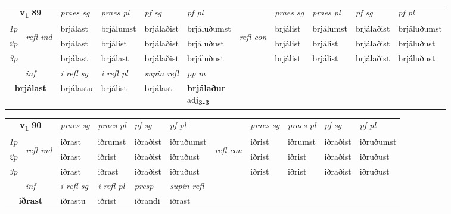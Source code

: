 \noindent
\begin{tabular}{lllllllllll} \toprule
\multicolumn{2}{c}{\textbf{v{\textsubscript{1}}} \Large{\textbf{89}}}  &  \textit{praes sg}  & \textit{praes pl}  &\textit{ pf sg} & \textit{pf pl} &  &  \textit{praes sg}  & \textit{praes pl}  & \textit{pf sg} & \textit{pf pl } \\*
	\cmidrule{3-6} \cmidrule{8-11}
 {\textit{1p}} & \multirow{3}{*}{\begin{turn}{90}\textit{refl ind}\end{turn}}  & brjálast & brjálumst & brjálaðist & brjáluðumst & \multirow{3}{*}{\begin{turn}{90}\textit{refl con}\end{turn}}  &brjálist & brjálumst & brjálaðist & brjáluðumst \\*
 {\textit{2p}} &  & brjálast & brjálist & brjálaðist & brjáluðust & &brjálist & brjálist & brjálaðist & brjáluðust \\*
 {\textit{3p}}  & & brjálast & brjálast & brjálaðist & brjáluðust & & brjálist & brjálist& brjálaðist & brjáluðust \\*
\cmidrule{3-6} \cmidrule{8-11}

   \multicolumn{2}{c}{\textit{inf}}   & \textit{i refl sg} & \textit{i refl pl}   & \textit{supin refl} & \textit{pp m} \\*
  \multicolumn{2}{c}{\textbf{brjálast}}    & brjálastu & brjálist   & brjálast & \specialcell{\textbf{brjálaður} \\ adj\textbf{\textsubscript{3-3}}} \\*
\end{tabular}

\noindent
\begin{tabular}{lllllllllll} \toprule
\multicolumn{2}{c}{\textbf{v{\textsubscript{1}}} \Large{\textbf{90}}}  &  \textit{praes sg}  & \textit{praes pl}  &\textit{ pf sg} & \textit{pf pl} &  &  \textit{praes sg}  & \textit{praes pl}  & \textit{pf sg} & \textit{pf pl } \\*
	\cmidrule{3-6} \cmidrule{8-11}
 {\textit{1p}} & \multirow{3}{*}{\begin{turn}{90}\textit{refl ind}\end{turn}}  & iðrast & iðrumst & iðraðist & iðruðumst & \multirow{3}{*}{\begin{turn}{90}\textit{refl con}\end{turn}}  &iðrist & iðrumst & iðraðist & iðruðumst \\*
 {\textit{2p}} &  & iðrast & iðrist & iðraðist & iðruðust & &iðrist & iðrist & iðraðist & iðruðust \\*
 {\textit{3p}}  & & iðrast & iðrast & iðraðist & iðruðust & & iðrist & iðrist& iðraðist & iðruðust \\*
\cmidrule{3-6} \cmidrule{8-11}

   \multicolumn{2}{c}{\textit{inf}}   & \textit{i refl sg} & \textit{i refl pl} & \textit{presp}  & \textit{supin refl}  \\*
  \multicolumn{2}{c}{\textbf{iðrast}}    & iðrastu & iðrist & iðrandi  & iðrast  \\*
\end{tabular}

